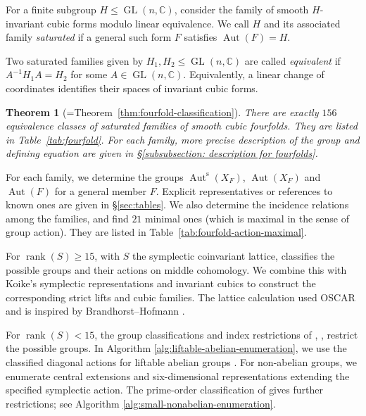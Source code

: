 \documentclass[12pt]{amsart}
\numberwithin{equation}{section}
\theoremstyle{plain}
\newtheorem{thm}{Theorem}[section]
\theoremstyle{definition}
\theoremstyle{remark}
\newcommand{\CC}{\mathbb C}
\DeclareMathOperator{\Aut}{Aut}
\DeclareMathOperator{\GL}{GL}
\DeclareMathOperator{\rank}{rank}
\newcommand{\Auts}{\Aut^{\mathrm s}}
\begin{document}
For a finite subgroup $H\leq\GL(n,\CC)$, consider the family of smooth
$H$-invariant cubic forms modulo linear equivalence.  We call $H$ and
its associated family \emph{saturated} if a general such form $F$ satisfies
$\Aut(F)=H$.

Two saturated families given by $H_1,H_2\leq\GL(n,\CC)$ are
called \emph{equivalent} if $A^{-1}H_1A=H_2$ for some
$A\in\GL(n,\CC)$. Equivalently, a linear change of coordinates
identifies their spaces of invariant cubic forms.

\begin{thm}[=Theorem~\ref{thm:fourfold-classification}]
\label{thm:fourfold}
There are exactly $156$ equivalence classes of saturated families of smooth cubic fourfolds. They are listed in Table~\ref{tab:fourfold}. For each family, more precise description of the group and defining equation are given in \S\ref{subsubsection: description for fourfolds}.
\end{thm}

For each family, we determine the groups
$\Auts(X_F)$, $\Aut(X_F)$ and $\Aut(F)$ for a general member $F$.
Explicit representatives or references to known ones are given in \S \ref{sec:tables}. We also determine the incidence relations among the families, and find $21$ minimal ones (which is maximal in the sense of group action). They are listed in Table~\ref{tab:fourfold-action-maximal}.

For $\rank(S)\geq15$, with $S$ the symplectic coinvariant lattice,
\cite{FZ26} classifies the possible groups and their
actions on middle cohomology. We combine this with Koike's symplectic
representations and invariant cubics \cite{KOIKE202512,KOIKE2026} to
construct the corresponding strict lifts and cubic families. The lattice calculation used OSCAR \cite{OSCAR} and is inspired by Brandhorst--Hofmann
\cite{Brandhorst_Hofmann_2023}.

For $\rank(S)<15$, the group classifications and index restrictions of
\cite{laza2022automorphisms}, \cite{yang2024automorphism}, \cite{FWZ26} restrict the
possible groups. In Algorithm \ref{alg:liftable-abelian-enumeration}, we use the classified diagonal actions for liftable
abelian groups \cite{zheng2021liftableabelian}. For non-abelian groups, we
enumerate central extensions and six-dimensional representations extending
the specified symplectic action. The prime-order classification of
\cite[Theorem~3.8]{gonzalez2011automorphisms} gives further restrictions; see Algorithm \ref{alg:small-nonabelian-enumeration}.
\end{document}

